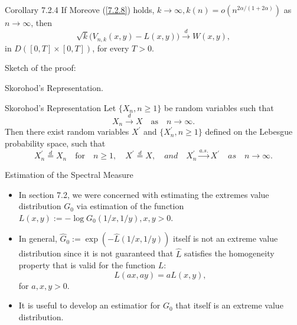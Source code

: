 \documentclass[11pt]{beamer}
\begin{document}
\begin{frame}{Corollary 7.2.4}
If Moreove (\ref{7.2.8}) holds, $k\to \infty, k(n)=o(n^{2\alpha/(1+2\alpha)})$ as $n \to \infty$, then
\begin{displaymath}
\sqrt{k}\big (V_{n,k}(x,y)-L(x,y)\big)\stackrel{d}{\to } W(x,y),
\end{displaymath}
in $D([0,T]\times [0,T])$, for every $T>0$.\par 
\vspace{2ex}
Sketch of the proof:\par 
\quad Skorohod's Representation.

\end{frame}

\begin{frame}{Skorohod's Representation}
	Let $\{X_n, n\ge 1\}$ be random variables such that 
	\begin{displaymath}
	X_n \stackrel{d}{\to} X \quad \text{as}\quad  n \to \infty.
	\end{displaymath} 
	Then there exist random variables $X^{'}$ and $\{X_n^{'}, n\ge 1\}$ defined on the Lebesgue
	probability space, such that
	\begin{displaymath}
	X_n^{'}\stackrel{d}{=} X_n \quad \text{for} \quad n \ge 1 ,\quad  X^{'}\stackrel{d}{=}X, \quad and \quad X_n^{'}\stackrel{a.s.}{\to}X^{'} \quad 	as \quad n \to \infty.
	\end{displaymath}
\end{frame}


 
\begin{frame}{Estimation of the Spectral Measure}
\begin{itemize}
\item In section 7.2, we were concerned with estimating the extremes value distribution $G_0$ via estimation of the function $L(x,y):=-\log G_0(1/x,1/y), x,y>0$. 
\item In general, $\hat{G}_0:=\exp(-\hat{L}(1/x,1/y))$ itself is not an extreme value distribution since it is not guaranteed that $\hat{L}$ satisfies the homogeneity property that is valid for the function $L$:
\begin{displaymath}
L(ax,ay)=aL(x,y),
\end{displaymath}
for $a,x,y>0.$
\item It is useful to develop an estimatior for $G_0$ that itself is an extreme value distribution.
\end{itemize}
\end{frame}
\end{document}
